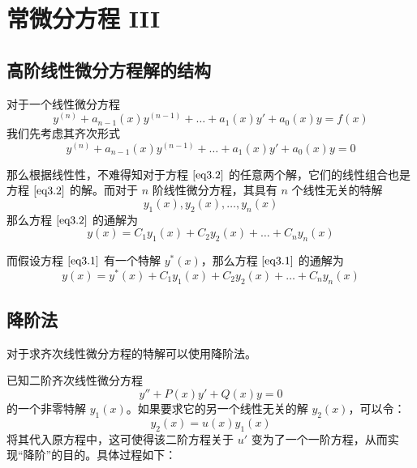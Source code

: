 \section{常微分方程 III}

\subsection{高阶线性微分方程解的结构}

对于一个线性微分方程
\begin{equation} \label{eq3.1}
    y^{(n)} + a_{n - 1}(x) y^{(n - 1)} + \dots + a_1(x) y' + a_0(x) y = f(x)
\end{equation}
我们先考虑其齐次形式
\begin{equation} \label{eq3.2}
    y^{(n)} + a_{n - 1}(x) y^{(n - 1)} + \dots + a_1(x) y' + a_0(x) y = 0
\end{equation}

那么根据线性性，不难得知对于方程 $\ref{eq3.2}$ 的任意两个解，它们的线性组合也是方程 $\ref{eq3.2}$ 的解。而对于 $n$ 阶线性微分方程，其具有 $n$ 个线性无关的特解
$$
y_1(x), y_2(x), \dots, y_n(x)
$$
那么方程 $\ref{eq3.2}$ 的通解为
$$
y(x) = C_1 y_1(x) + C_2 y_2(x) + \dots + C_n y_n(x)
$$

而假设方程 $\ref{eq3.1}$ 有一个特解 $y^*(x)$，那么方程 $\ref{eq3.1}$ 的通解为
$$
y(x) = y^*(x) + C_1 y_1(x) + C_2 y_2(x) + \dots + C_n y_n(x)
$$

\subsection{降阶法}

对于求齐次线性微分方程的特解可以使用降阶法。

已知二阶齐次线性微分方程
\begin{equation} \label{eq3.3}
    y'' + P(x) y' + Q(x) y = 0
\end{equation}
的一个非零特解 $y_1(x)$。如果要求它的另一个线性无关的解 $y_2(x)$，可以令：
$$
y_2(x) = u(x) y_1(x)
$$
将其代入原方程中，这可使得该二阶方程关于 $u'$ 变为了一个一阶方程，从而实现“降阶”的目的。具体过程如下：

